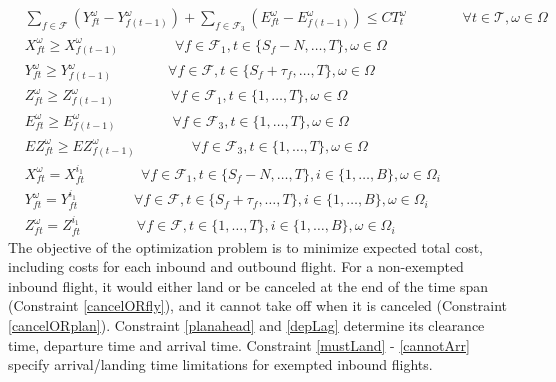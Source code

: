 \documentclass[12pt]{article}
\begin{document}
\begin{align}
		& \sum_{f \in \mathcal{F}}\left(Y_{ft}^\omega - Y_{f(t-1)}^\omega\right) + \sum_{f \in \mathcal{F}_3}\left(E_{ft}^\omega - E_{f(t-1)}^\omega\right) \leq CT_t^\omega \qquad \qquad \forall t \in \mathcal{T}, \omega \in \Omega \\
		& X_{ft}^\omega \geq X_{f(t-1)}^\omega \qquad \qquad \forall f \in \mathcal{F}_1, t \in \{S_f - N, \dots, T\}, \omega \in \Omega\\
		& Y_{ft}^\omega \geq Y_{f(t-1)}^\omega \qquad \qquad \forall f \in \mathcal{F}, t \in \{S_f + \tau_f, \dots, T\}, \omega \in \Omega\\
		& Z_{ft}^\omega \geq Z_{f(t-1)}^\omega \qquad \qquad \forall f \in \mathcal{F}_1, t \in \{1, \dots, T\}, \omega \in \Omega\\
		& E_{ft}^\omega \geq E_{f(t-1)}^\omega \qquad \qquad \forall f \in \mathcal{F}_3, t \in \{1, \dots, T\}, \omega \in \Omega\\
		& EZ_{ft}^\omega \geq EZ_{f(t-1)}^\omega \qquad \qquad \forall f \in \mathcal{F}_3, t \in \{1, \dots, T\}, \omega \in \Omega\\
		& X_{ft}^\omega = X_{ft}^{i_1} \qquad \qquad \forall f \in \mathcal{F}_1, t \in \{S_f - N, \dots, T\}, i \in \{1, \dots, B\}, \omega \in \Omega_i\\
		& Y_{ft}^\omega = Y_{ft}^{i_1} \qquad \qquad \forall f \in \mathcal{F}, t \in \{S_f + \tau_f, \dots, T\}, i \in \{1, \dots, B\}, \omega \in \Omega_i\\
		& Z_{ft}^\omega = Z_{ft}^{i_1} \qquad \qquad \forall f \in \mathcal{F}, t \in \{1, \dots, T\}, i \in \{1, \dots, B\}, \omega \in \Omega_i
	\end{align}
	The objective of the optimization problem is to minimize expected total cost, including costs for each inbound and outbound flight. For a non-exempted inbound flight, it would either land or be canceled at the end of the time span (Constraint \ref{cancelORfly}), and it cannot take off when it is canceled (Constraint \ref{cancelORplan}). Constraint \ref{planahead} and \ref{depLag} determine its clearance time, departure time and arrival time. Constraint \ref{mustLand} - \ref{cannotArr} specify arrival/landing time limitations for exempted inbound flights.
	
\end{document}
